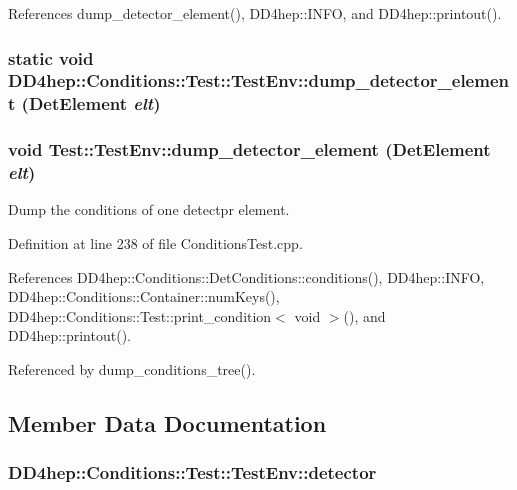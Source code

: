 References dump\_\-detector\_\-element(), DD4hep::INFO, and DD4hep::printout().\hypertarget{struct_d_d4hep_1_1_conditions_1_1_test_1_1_test_env_aa21613eb3a5e779b69819c285344a2a7}{
\subsubsection[{dump\_\-detector\_\-element}]{\setlength{\rightskip}{0pt plus 5cm}static void DD4hep::Conditions::Test::TestEnv::dump\_\-detector\_\-element ({\bf DetElement} {\em elt})}}
\label{struct_d_d4hep_1_1_conditions_1_1_test_1_1_test_env_aa21613eb3a5e779b69819c285344a2a7}
\hypertarget{struct_d_d4hep_1_1_conditions_1_1_test_1_1_test_env_ab2a1c2b98a13f7f935e4aeb55dadf33a}{
\subsubsection[{dump\_\-detector\_\-element}]{\setlength{\rightskip}{0pt plus 5cm}void Test::TestEnv::dump\_\-detector\_\-element ({\bf DetElement} {\em elt})}}
\label{struct_d_d4hep_1_1_conditions_1_1_test_1_1_test_env_ab2a1c2b98a13f7f935e4aeb55dadf33a}


Dump the conditions of one detectpr element. 

Definition at line 238 of file ConditionsTest.cpp.

References DD4hep::Conditions::DetConditions::conditions(), DD4hep::INFO, DD4hep::Conditions::Container::numKeys(), DD4hep::Conditions::Test::print\_\-condition$<$ void $>$(), and DD4hep::printout().

Referenced by dump\_\-conditions\_\-tree().

\subsection{Member Data Documentation}
\hypertarget{struct_d_d4hep_1_1_conditions_1_1_test_1_1_test_env_a08451dbdbf34ecff0e383bb617f78c29}{
\subsubsection[{detector}]{ {\bf DD4hep::Conditions::Test::TestEnv::detector}}}
\label{struct_d_d4hep_1_1_conditions_1_1_test_1_1_test_env_a08451dbdbf34ecff0e383bb617f78c29}


